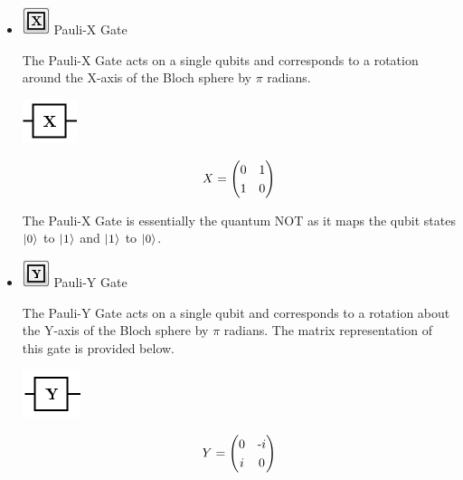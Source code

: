 \documentclass[10pt]{article}
\theoremstyle{definition}
\newcommand{\microspace}{\mspace{0.5mu}}
\def \lket {\left|}
\def \rket {\right\rangle}
\newcommand{\ket}[1]{\lket\microspace #1 \microspace\rket}
\begin{document}
\begin{itemize}
\item \includegraphics{Figures/Gates/XGate.png}  Pauli-X Gate

The Pauli-X Gate acts on a single qubits and corresponds to a rotation around the X-axis of the Bloch sphere by $\pi$ radians.

\begin{center}
\includegraphics[scale=.7]{Figures/Gates/XGateViewer} \\
  \vspace*{3pt}
  \begin{minipage}{.9\linewidth}
    \begin{equation*} \label{mat:XGate}
    \renewcommand{\arraystretch}{1.25}
X = \begin{pmatrix} 0 & 1 \\ 1 & 0 \end{pmatrix}
    \end{equation*}
  \end{minipage}\hspace{-2.5cm}
\end{center}

The Pauli-X Gate is essentially the quantum NOT as it maps the qubit states $\ket{0}$ to $\ket{1}$ and $\ket{1}$ to $\ket{0}$. 

\item \includegraphics{Figures/Gates/YGate.png}  Pauli-Y Gate

The Pauli-Y Gate acts on a single qubit and corresponds to a rotation about the Y-axis of the Bloch sphere by $\pi$ radians. The matrix representation of this gate is provided below. 

\begin{center}
\includegraphics[scale=.7]{Figures/Gates/YGateViewer} \\
  \vspace*{3pt}
  \begin{minipage}{.9\linewidth}
    \begin{equation*} \label{mat:YGate}
    \renewcommand{\arraystretch}{1.25}
Y = \begin{pmatrix} 0 & \textnormal{-}i \\ i & 0 \end{pmatrix}
    \end{equation*}
  \end{minipage}\hspace{-2.5cm}
\end{center}


\end{itemize}
\end{document}
